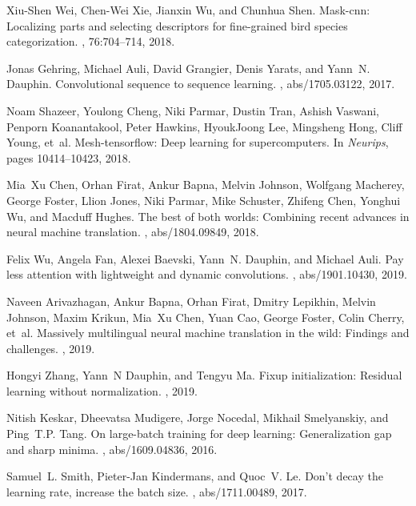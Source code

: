 \documentclass{article}
\begin{document}
\begin{thebibliography}{10}
Xiu-Shen Wei, Chen-Wei Xie, Jianxin Wu, and Chunhua Shen.
\newblock Mask-cnn: Localizing parts and selecting descriptors for fine-grained
  bird species categorization.
, 76:704--714, 2018.

Jonas Gehring, Michael Auli, David Grangier, Denis Yarats, and Yann~N. Dauphin.
\newblock Convolutional sequence to sequence learning.
, abs/1705.03122, 2017.

Noam Shazeer, Youlong Cheng, Niki Parmar, Dustin Tran, Ashish Vaswani, Penporn
  Koanantakool, Peter Hawkins, HyoukJoong Lee, Mingsheng Hong, Cliff Young,
  et~al.
\newblock Mesh-tensorflow: Deep learning for supercomputers.
\newblock In {\em Neurips}, pages 10414--10423, 2018.

Mia~Xu Chen, Orhan Firat, Ankur Bapna, Melvin Johnson, Wolfgang Macherey,
  George Foster, Llion Jones, Niki Parmar, Mike Schuster, Zhifeng Chen, Yonghui
  Wu, and Macduff Hughes.
\newblock The best of both worlds: Combining recent advances in neural machine
  translation.
, abs/1804.09849, 2018.

Felix Wu, Angela Fan, Alexei Baevski, Yann~N. Dauphin, and Michael Auli.
\newblock Pay less attention with lightweight and dynamic convolutions.
, abs/1901.10430, 2019.

Naveen Arivazhagan, Ankur Bapna, Orhan Firat, Dmitry Lepikhin, Melvin Johnson,
  Maxim Krikun, Mia~Xu Chen, Yuan Cao, George Foster, Colin Cherry, et~al.
\newblock Massively multilingual neural machine translation in the wild:
  Findings and challenges.
, 2019.

Hongyi Zhang, Yann~N Dauphin, and Tengyu Ma.
\newblock Fixup initialization: Residual learning without normalization.
, 2019.

Nitish Keskar, Dheevatsa Mudigere, Jorge Nocedal, Mikhail Smelyanskiy, and
  Ping~T.P. Tang.
\newblock On large-batch training for deep learning: Generalization gap and
  sharp minima.
, abs/1609.04836, 2016.

Samuel~L. Smith, Pieter{-}Jan Kindermans, and Quoc~V. Le.
\newblock Don't decay the learning rate, increase the batch size.
, abs/1711.00489, 2017.


\end{thebibliography}
\end{document}
